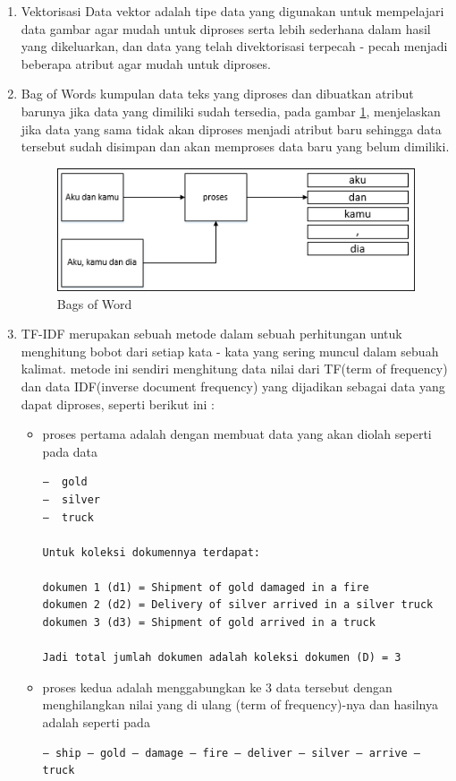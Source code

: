 \begin{enumerate}
\item Vektorisasi Data
\subitem vektor adalah tipe data yang digunakan untuk mempelajari data gambar agar mudah untuk diproses serta lebih sederhana dalam hasil yang dikeluarkan, dan data yang telah divektorisasi terpecah - pecah menjadi beberapa atribut agar mudah untuk diproses.

\item Bag of Words
\subitem kumpulan data teks yang diproses dan dibuatkan atribut barunya jika data yang dimiliki sudah tersedia, pada gambar \ref{coba4}, menjelaskan jika data yang sama tidak akan diproses menjadi atribut baru sehingga data tersebut sudah disimpan dan akan memproses data baru yang belum dimiliki.
\begin{figure}[!htbp]
	\centering
	\includegraphics[width=1\textwidth]{figures/fathi/chapter4/hari1/4}
	\caption{Bags of Word}
	\label{coba4}
\end{figure}

\item TF-IDF
\subitem merupakan sebuah metode dalam sebuah perhitungan untuk menghitung bobot dari setiap kata - kata yang sering muncul dalam sebuah kalimat. metode ini sendiri menghitung data nilai dari TF(term of frequency) dan data IDF(inverse document frequency) yang dijadikan sebagai data yang dapat diproses, seperti berikut ini :
\begin{itemize}
\item proses pertama adalah dengan membuat data yang akan diolah seperti pada data 
\begin{verbatim}
–  gold
–  silver
–  truck

Untuk koleksi dokumennya terdapat:

dokumen 1 (d1) = Shipment of gold damaged in a fire
dokumen 2 (d2) = Delivery of silver arrived in a silver truck
dokumen 3 (d3) = Shipment of gold arrived in a truck

Jadi total jumlah dokumen adalah koleksi dokumen (D) = 3
\end{verbatim}

\item proses kedua adalah menggabungkan ke 3 data tersebut dengan menghilangkan nilai yang di ulang (term of frequency)-nya dan hasilnya adalah seperti pada 
\begin{verbatim}
– ship – gold – damage – fire – deliver – silver – arrive – truck
\end{verbatim}


\end{itemize}
\end{enumerate}
